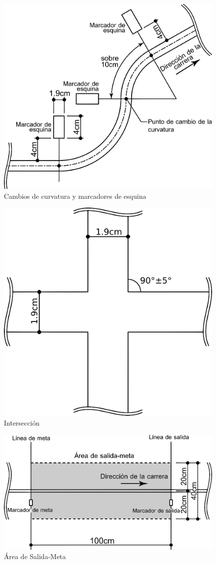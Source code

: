 \begin{figure}[H]
  \centering
  \includegraphics[width=0.6\linewidth]{./images/rules/figure2.png}
  \caption{Cambios de curvatura y marcadores de esquina}
\end{figure}

\begin{figure}[H]
  \centering
  \includegraphics[width=0.6\linewidth]{./images/rules/figure3.png}
  \caption{Intersección}
\end{figure}

\begin{figure}[H]
  \centering
  \includegraphics[width=0.6\linewidth]{./images/rules/figure4.png}
  \caption{Área de Salida-Meta}
\end{figure}

